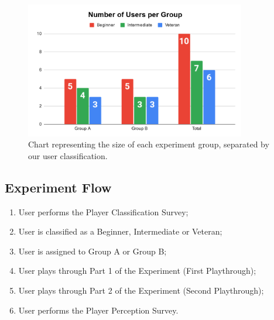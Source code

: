 \begin{figure}[!ht]
    \caption{Chart representing the size of each experiment group, separated by our user classification.}
    \begin{center}
        \includegraphics[width=26em]{figures/fig-user-groups.png}
    \end{center}
    \label{fig:user-group-sizes}
\end{figure}

\subsection{Experiment Flow}


\begin{enumerate}
    \item{User performs the Player Classification Survey;}
    \item{User is classified as a Beginner, Intermediate or Veteran;}
    \item{User is assigned to Group A or Group B;}
    \item{User plays through Part 1 of the Experiment (First Playthrough);}
    \item{User plays through Part 2 of the Experiment (Second Playthrough);}
    \item{User performs the Player Perception Survey.}
\end{enumerate}


